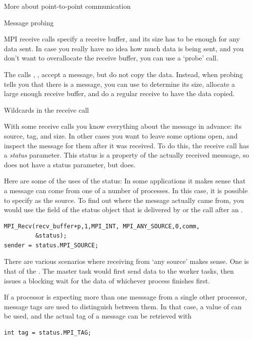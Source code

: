 
 {More about point-to-point communication}

 {Message probing}

MPI receive calls specify a receive buffer, and its size has to be
enough for any data sent. In case you really have no idea how much data
is being sent, and you don't want to overallocate the receive buffer,
you can use a `probe' call.

The calls , , accept a message,
but do not copy the data. Instead, when probing tells you that there is a
message, you can use  to determine its size,
allocate a large enough receive buffer, and do a regular receive to
have the data copied.

 {Wildcards in the receive call}

With some receive calls you know everything about the message in advance:
its source, tag, and size. In other cases you want to leave some options
open, and inspect the message for them after it was received.
To do this, the receive call has a \emph{status}
parameter.
This status is a property of the actually received messsage, so 
does not have a status parameter, but  does.

Here are some of the uses of the status:
 In some applications it makes sense that a message can come from 
one of a number of processes. In this case, it is possible to specify
 as the source. To find out where the message actually
came from, you would use the  field of the status object
that is delivered by  or the  call after an .
\begin{verbatim}
MPI_Recv(recv_buffer+p,1,MPI_INT, MPI_ANY_SOURCE,0,comm,
         &status);
sender = status.MPI_SOURCE;
\end{verbatim}

There are various scenarios where receiving from `any source' makes sense.
One is that of the . The master task would first send
data to the worker tasks, then issues a blocking wait for the data of whichever process
finishes first.

If a processor is expecting more than one messsage from a single other processor,
message tags are used to distinguish between them. In that case,
a value of  can be used, and the actual tag
of a message can be retrieved with
\begin{verbatim}
int tag = status.MPI_TAG;
\end{verbatim}

